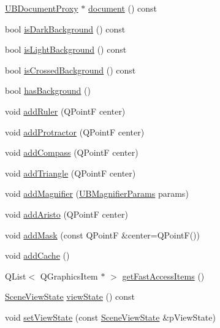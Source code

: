 \begin{DoxyCompactItemize}
\item 
\hyperlink{class_u_b_document_proxy}{U\-B\-Document\-Proxy} $\ast$ \hyperlink{class_u_b_graphics_scene_a718297b6e060113fee9e8c7e822f6d39}{document} () const 
\item 
bool \hyperlink{class_u_b_graphics_scene_ad91ed6e458beecd1ee198991c703082c}{is\-Dark\-Background} () const 
\item 
bool \hyperlink{class_u_b_graphics_scene_a5aae0ae9d03855f49d4eec4d69f772a9}{is\-Light\-Background} () const 
\item 
bool \hyperlink{class_u_b_graphics_scene_a0e75e26b28c507fa963915433078e238}{is\-Crossed\-Background} () const 
\item 
bool \hyperlink{class_u_b_graphics_scene_a1b5b38e0006cfbbad81bcc2ec20da600}{has\-Background} ()
\item 
void \hyperlink{class_u_b_graphics_scene_a9202ba429a1f36097245ff3f3ab2923c}{add\-Ruler} (Q\-Point\-F center)
\item 
void \hyperlink{class_u_b_graphics_scene_a9e90c1135dfb13c9f0ce52e79c2888e1}{add\-Protractor} (Q\-Point\-F center)
\item 
void \hyperlink{class_u_b_graphics_scene_aa8ac2bb89fd0938d3befa5d572437456}{add\-Compass} (Q\-Point\-F center)
\item 
void \hyperlink{class_u_b_graphics_scene_ab8df2497fc918346cb013ab03b2f08f3}{add\-Triangle} (Q\-Point\-F center)
\item 
void \hyperlink{class_u_b_graphics_scene_a68db5657dde886826bad2e633db1c703}{add\-Magnifier} (\hyperlink{class_u_b_magnifier_params}{U\-B\-Magnifier\-Params} params)
\item 
void \hyperlink{class_u_b_graphics_scene_a8d8bb9ec5703090690312c04be144cdb}{add\-Aristo} (Q\-Point\-F center)
\item 
void \hyperlink{class_u_b_graphics_scene_a02a8ac1e658e33332317c9e5b9ee6ee8}{add\-Mask} (const Q\-Point\-F \&center=Q\-Point\-F())
\item 
void \hyperlink{class_u_b_graphics_scene_a81fa8cbc224c10469d7cb44e3a8eaf6c}{add\-Cache} ()
\item 
Q\-List$<$ Q\-Graphics\-Item $\ast$ $>$ \hyperlink{class_u_b_graphics_scene_a8c683870fe53e039ff4fed003c114482}{get\-Fast\-Access\-Items} ()
\item 
\hyperlink{class_u_b_graphics_scene_1_1_scene_view_state}{Scene\-View\-State} \hyperlink{class_u_b_graphics_scene_a2c461538b738de847dfe029bb27b7439}{view\-State} () const 
\item 
void \hyperlink{class_u_b_graphics_scene_a3d3e53091814e68510f12c4b40649e1b}{set\-View\-State} (const \hyperlink{class_u_b_graphics_scene_1_1_scene_view_state}{Scene\-View\-State} \&p\-View\-State)

\end{DoxyCompactItemize}
